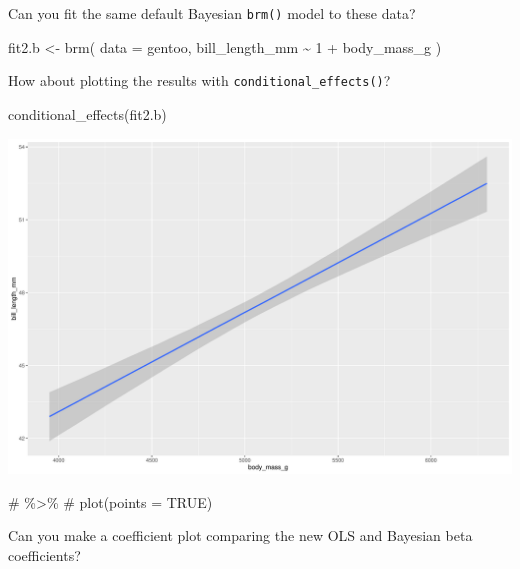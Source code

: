 \documentclass[
  letterpaper,
  DIV=11,
  numbers=noendperiod]{scrartcl}
\newenvironment{Shaded}{\begin{snugshade}}{\end{snugshade}}
\newcommand{\AttributeTok}[1]{\textcolor[rgb]{0.40,0.45,0.13}{#1}}
\newcommand{\CommentTok}[1]{\textcolor[rgb]{0.37,0.37,0.37}{#1}}
\newcommand{\DecValTok}[1]{\textcolor[rgb]{0.68,0.00,0.00}{#1}}
\newcommand{\FunctionTok}[1]{\textcolor[rgb]{0.28,0.35,0.67}{#1}}
\newcommand{\NormalTok}[1]{\textcolor[rgb]{0.00,0.23,0.31}{#1}}
\newcommand{\OtherTok}[1]{\textcolor[rgb]{0.00,0.23,0.31}{#1}}
\newcommand{\SpecialCharTok}[1]{\textcolor[rgb]{0.37,0.37,0.37}{#1}}
\begin{document}
Can you fit the same default Bayesian \texttt{brm()} model to these
data?

\begin{Shaded}
\begin{Highlighting}[]
\NormalTok{fit2.b }\OtherTok{\textless{}{-}} \FunctionTok{brm}\NormalTok{(}
  \AttributeTok{data =}\NormalTok{ gentoo,}
\NormalTok{  bill\_length\_mm }\SpecialCharTok{\textasciitilde{}} \DecValTok{1} \SpecialCharTok{+}\NormalTok{ body\_mass\_g}
\NormalTok{)}
\end{Highlighting}
\end{Shaded}

How about plotting the results with \texttt{conditional\_effects()}?

\begin{Shaded}
\begin{Highlighting}[]
\FunctionTok{conditional\_effects}\NormalTok{(fit2.b)}
\end{Highlighting}
\end{Shaded}

\includegraphics{Bayes_Lab_1_files/figure-pdf/unnamed-chunk-31-1.pdf}

\begin{Shaded}
\begin{Highlighting}[]
\CommentTok{\# \%\textgreater{}\% }
\CommentTok{\#   plot(points = TRUE)}
\end{Highlighting}
\end{Shaded}

Can you make a coefficient plot comparing the new OLS and Bayesian beta
coefficients?
\end{document}
